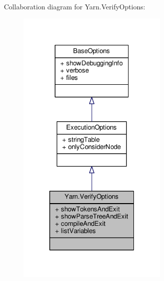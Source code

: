 Collaboration diagram for Yarn.\-Verify\-Options\-:
\nopagebreak
\begin{figure}[H]
\begin{center}
\leavevmode
\includegraphics[width=208pt]{da/d36/a00650}
\end{center}
\end{figure}
